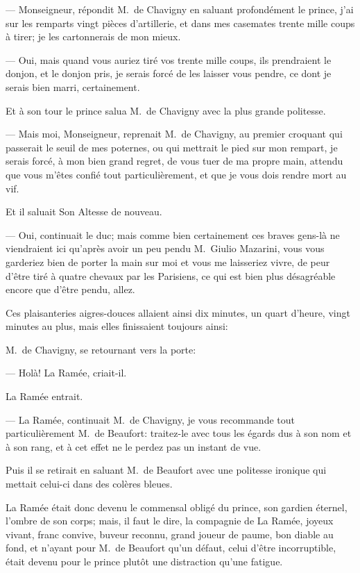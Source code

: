 — Monseigneur, répondit M.~de Chavigny en saluant profondément le prince, j'ai sur les remparts vingt pièces d'artillerie, et dans mes casemates trente mille coups à tirer; je les cartonnerais de mon mieux.

— Oui, mais quand vous auriez tiré vos trente mille coups, ils prendraient le donjon, et le donjon pris, je serais forcé de les laisser vous pendre, ce dont je serais bien marri, certainement.

Et à son tour le prince salua M.~de Chavigny avec la plus grande politesse.

— Mais moi, Monseigneur, reprenait M.~de Chavigny, au premier croquant qui passerait le seuil de mes poternes, ou qui mettrait le pied sur mon rempart, je serais forcé, à mon bien grand regret, de vous tuer de ma propre main, attendu que vous m'êtes confié tout particulièrement, et que je vous dois rendre mort au vif.

Et il saluait Son Altesse de nouveau.

— Oui, continuait le duc; mais comme bien certainement ces braves gens-là ne viendraient ici qu'après avoir un peu pendu M.~Giulio Mazarini, vous vous garderiez bien de porter la main sur moi et vous me laisseriez vivre, de peur d'être tiré à quatre chevaux par les Parisiens, ce qui est bien plus désagréable encore que d'être pendu, allez.

Ces plaisanteries aigres-douces allaient ainsi dix minutes, un quart d'heure, vingt minutes au plus, mais elles finissaient toujours ainsi:

M.~de Chavigny, se retournant vers la porte:

— Holà! La Ramée, criait-il.

La Ramée entrait.

— La Ramée, continuait M.~de Chavigny, je vous recommande tout particulièrement M.~de Beaufort: traitez-le avec tous les égards dus à son nom et à son rang, et à cet effet ne le perdez pas un instant de vue.

Puis il se retirait en saluant M.~de Beaufort avec une politesse ironique qui mettait celui-ci dans des colères bleues.

La Ramée était donc devenu le commensal obligé du prince, son gardien éternel, l'ombre de son corps; mais, il faut le dire, la compagnie de La Ramée, joyeux vivant, franc convive, buveur reconnu, grand joueur de paume, bon diable au fond, et n'ayant pour M.~de Beaufort qu'un défaut, celui d'être incorruptible, était devenu pour le prince plutôt une distraction qu'une fatigue.

